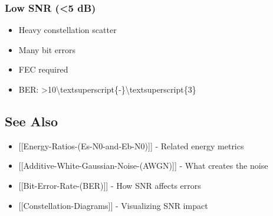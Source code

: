 \subsubsection{Low SNR (\textless5 dB)}\label{low-snr-5-db}

\begin{itemize}
\tightlist
\item
  Heavy constellation scatter
\item
  Many bit errors
\item
  FEC required
\item
  BER:
  \textgreater10\textbackslash textsuperscript\{-\}\textbackslash textsuperscript\{3\}
\end{itemize}

\subsection{See Also}\label{see-also}

\begin{itemize}
\tightlist
\item
  {[}{[}Energy-Ratios-(Es-N0-and-Eb-N0){]}{]} - Related energy metrics
\item
  {[}{[}Additive-White-Gaussian-Noise-(AWGN){]}{]} - What creates the
  noise
\item
  {[}{[}Bit-Error-Rate-(BER){]}{]} - How SNR affects errors
\item
  {[}{[}Constellation-Diagrams{]}{]} - Visualizing SNR impact
\end{itemize}
